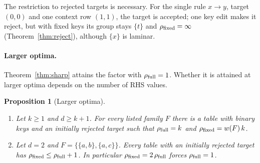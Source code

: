 \documentclass[11pt]{article}
\newtheorem{proposition}{Proposition}
\theoremstyle{remark}
\newcommand{\INF}{\infty}
\newcommand{\rfull}{\rho_{\rm full}}
\newcommand{\rfix}{\rho_{\rm fixed}}
\begin{document}
The restriction to rejected targets is necessary. For the single rule $x\to y$,
target $(0,0)$ and one context row $(1,1)$, the target is accepted; one key
edit makes it reject, but with fixed keys its group stays $\{t\}$ and
$\rfix=\INF$ (Theorem~\ref{thm:reject}), although $\{x\}$ is laminar.

\paragraph{Larger optima.}
Theorem~\ref{thm:sharp} attains the factor with $\rfull=1$. Whether it is
attained at larger optima depends on the number of RHS values.

\begin{proposition}[Larger optima]\label{prop:scale}
\begin{enumerate}
\item[(a)] Let $k\ge1$ and $d\ge k+1$. For every listed family $F$ there is a
table with binary keys and an initially rejected target such that $\rfull=k$
and $\rfix=w(F)\,k$.
\item[(b)] Let $d=2$ and $F=\{\{a,b\},\{a,c\}\}$. Every table with an initially
rejected target has $\rfix\le\rfull+1$. In particular $\rfix=2\,\rfull$ forces
$\rfull=1$.
\end{enumerate}
\end{proposition}
\end{document}
